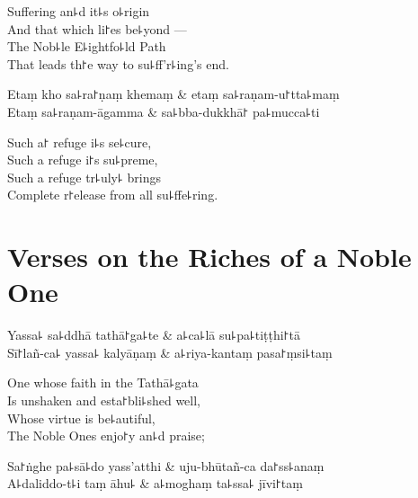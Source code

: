 \begin{english}
  Suffering an꜕d it꜕s o꜕rigin\\
  And that which li꜓es be꜕yond ---\\
  The Nob꜕le E꜕ightfo꜕ld Path\\
  That leads th꜓e way to su꜕ff'r꜕ing's end.
\end{english}

\begin{twochants}
  Etaṃ kho sa꜕ra꜓ṇaṃ khemaṃ & etaṃ sa꜕raṇam-u꜓tta꜕maṃ \\
  Etaṃ sa꜕raṇam-āgamma & sa꜕bba-dukkhā꜓ pa꜕mucca꜕ti \\
\end{twochants}

\begin{english}
  Such a꜓ refuge i꜕s se꜕cure,\\
  Such a refuge i꜓s su꜕preme,\\
  Such a refuge tr꜕uly꜕ brings\\
  Complete r꜓elease from all su꜕ffe꜕ring.
\end{english}

\chapter{Verses on the Riches of a Noble One}%



\begin{leader}
\end{leader}

\begin{twochants}
  Yassa꜕ sa꜕ddhā tathā꜓ga꜕te & a꜕ca꜕lā su꜕pa꜕tiṭṭhi꜓tā \\
  Sī꜓lañ-ca꜕ yassa꜕ kalyāṇaṃ & a꜕riya-kantaṃ pasa꜓ṃsi꜕taṃ \\
\end{twochants}

\begin{english}
  One whose faith in the Tathā꜕gata\\
  Is unshaken and esta꜓bli꜕shed well,\\
  Whose virtue is be꜕autiful,\\
  The Noble Ones enjo꜓y an꜕d praise;
\end{english}

\begin{twochants}
  Sa꜓ṅghe pa꜕sā꜕do yass'atthi & uju-bhūtañ-ca da꜓ss꜕anaṃ \\
  A꜕daliddo-t꜕i taṃ āhu꜕ & a꜕moghaṃ ta꜕ssa꜕ jīvi꜓taṃ \\
\end{twochants}

